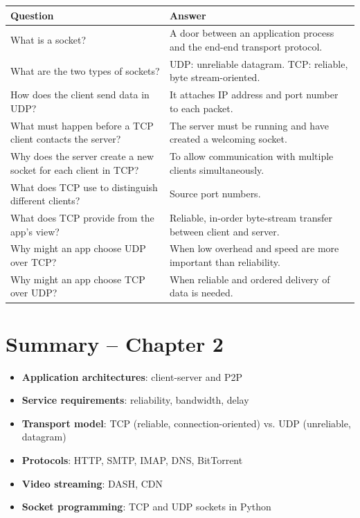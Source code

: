 \begin{exambox}
\small
\begin{longtable}{p{7cm}p{7cm}}
\toprule
\textbf{Question} & \textbf{Answer} \\
\midrule
\endhead
What is a socket? & A door between an application process and the end-end transport protocol. \\
\midrule
What are the two types of sockets? & UDP: unreliable datagram. TCP: reliable, byte stream-oriented. \\
\midrule
How does the client send data in UDP? & It attaches IP address and port number to each packet. \\
\midrule
What must happen before a TCP client contacts the server? & The server must be running and have created a welcoming socket. \\
\midrule
Why does the server create a new socket for each client in TCP? & To allow communication with multiple clients simultaneously. \\
\midrule
What does TCP use to distinguish different clients? & Source port numbers. \\
\midrule
What does TCP provide from the app's view? & Reliable, in-order byte-stream transfer between client and server. \\
\midrule
Why might an app choose UDP over TCP? & When low overhead and speed are more important than reliability. \\
\midrule
Why might an app choose TCP over UDP? & When reliable and ordered delivery of data is needed. \\
\bottomrule
\end{longtable}
\end{exambox}


\newpage
\section{Summary -- Chapter 2}

\begin{keybox}
\begin{itemize}[noitemsep]
    \item \textbf{Application architectures}: client-server and P2P
    \item \textbf{Service requirements}: reliability, bandwidth, delay
    \item \textbf{Transport model}: TCP (reliable, connection-oriented) vs. UDP (unreliable, datagram)
    \item \textbf{Protocols}: HTTP, SMTP, IMAP, DNS, BitTorrent
    \item \textbf{Video streaming}: DASH, CDN
    \item \textbf{Socket programming}: TCP and UDP sockets in Python
\end{itemize}
\end{keybox}


